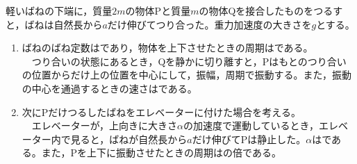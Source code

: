 \hakosyokika
\item
    \begin{mawarikomi}{50pt}{}
        軽いばねの下端に，質量$2m$の物体Pと質量$m$の物体Qを接合したものをつるすと，ばねは自然長から$a$だけ伸びてつり合った。重力加速度の大きさを$g$とする。
        \begin{enumerate}
            \item ばねのばね定数は\Hako であり，物体を上下させたときの周期は\Hako である。\\
            ~~つり合いの状態にあるとき，Qを静かに切り離すと，Pはもとのつり合いの位置から\Hako だけ上の位置を中心にして，振幅\Hako ，周期\Hako で振動する。また，振動の中心を通過するときの速さは\Hako である。
            \item 次にPだけつるしたばねをエレベーターに付けた場合を考える。\\
            ~~エレベーターが，上向きに大きさ$\alpha $の加速度で運動しているとき，エレベーター内で見ると，ばねが自然長から$a$だけ伸びてPは静止した。$\alpha $は\Hako である。また，Pを上下に振動させたときの周期はの\Hako 倍である。
        \end{enumerate}
    \end{mawarikomi}